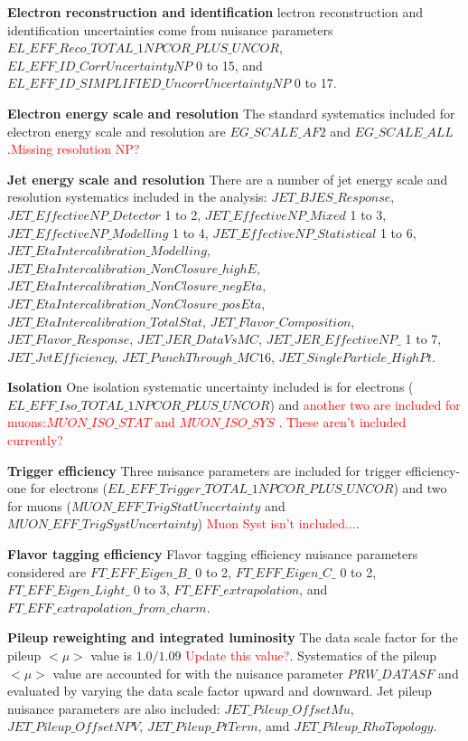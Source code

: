 \textbf{Electron reconstruction and identification}
lectron reconstruction and identification uncertainties come from nuisance parameters $EL\_EFF\_Reco\_TOTAL\_1NPCOR\_PLUS\_UNCOR$,$EL\_EFF\_ID\_CorrUncertaintyNP$ 0 to 15, and $EL\_EFF\_ID\_SIMPLIFIED\_UncorrUncertaintyNP$ 0 to 17.

\textbf{Electron energy scale and resolution}
The standard systematics included for electron energy scale and resolution are $EG\_SCALE\_AF2$ and $EG\_SCALE\_ALL$.\textcolor{red}{Missing resolution NP?}

\textbf{Jet energy scale and resolution}
There are a number of jet energy scale and resolution systematics included in the analysis: $JET\_BJES\_Response$,$JET\_EffectiveNP\_Detector$ 1 to 2, $JET\_EffectiveNP\_Mixed$ 1 to 3, $JET\_EffectiveNP\_Modelling$ 1 to 4, $JET\_EffectiveNP\_Statistical$ 1 to 6, $JET\_EtaIntercalibration\_Modelling$, $JET\_EtaIntercalibration\_NonClosure\_highE$, $JET\_EtaIntercalibration\_NonClosure\_negEta$, $JET\_EtaIntercalibration\_NonClosure\_posEta$, $JET\_EtaIntercalibration\_TotalStat$, $JET\_Flavor\_Composition$, $JET\_Flavor\_Response$, $JET\_JER\_DataVsMC$, $JET\_JER\_EffectiveNP\_$ 1 to 7, $JET\_JvtEfficiency$, $JET\_PunchThrough\_MC16$, $JET\_SingleParticle\_HighPt$.

\textbf{Isolation}
One isolation systematic uncertainty included is for electrons ($EL\_EFF\_Iso\_TOTAL\_1NPCOR\_PLUS\_UNCOR$) and \textcolor{red}{another two are included for muons:$MUON\_ISO\_STAT$ and $MUON\_ISO\_SYS$ . These aren't included currently?}

\textbf{Trigger efficiency}
Three nuisance parameters are included for trigger efficiency- one for electrons ($EL\_EFF\_Trigger\_TOTAL\_1NPCOR\_PLUS\_UNCOR$) and two for muons ($MUON\_EFF\_TrigStatUncertainty$ and $MUON\_EFF\_TrigSystUncertainty$) \textcolor{red}{Muon Syst isn't included...}.

\textbf{Flavor tagging efficiency}
Flavor tagging efficiency nuisance parameters considered are $FT\_EFF\_Eigen\_B\_$ 0 to 2, $FT\_EFF\_Eigen\_C\_$ 0 to 2, $FT\_EFF\_Eigen\_Light\_$ 0 to 3, $FT\_EFF\_extrapolation$, and $FT\_EFF\_extrapolation\_from\_charm$.

\textbf{Pileup reweighting and integrated luminosity}
The data scale factor for the pileup $<\mu>$ value is $1.0/1.09$ \textcolor{red}{Update this value?}. Systematics of the pileup $<\mu>$ value are accounted for with the nuisance parameter $PRW\_DATASF$ and evaluated by varying the data scale factor upward and downward. Jet pileup nuisance parameters are also included: $JET\_Pileup\_OffsetMu$,$JET\_Pileup\_OffsetNPV$, $JET\_Pileup\_PtTerm$, amd $JET\_Pileup\_RhoTopology$.

